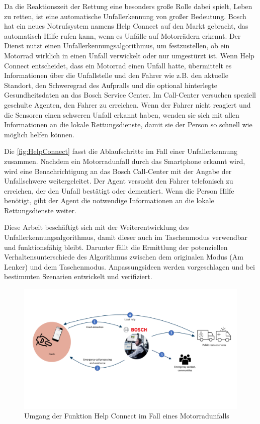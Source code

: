 Da die Reaktionszeit der Rettung eine besonders große Rolle dabei spielt, Leben zu retten, ist eine automatische Unfallerkennung von großer Bedeutung.
Bosch hat ein neues Notrufsystem namens \glqq Help Connect\grqq{} auf den Markt gebracht, das automatisch Hilfe rufen kann, wenn es Unfälle auf Motorrädern erkennt.
Der Dienst nutzt einen Unfallerkennungsalgorithmus, um festzustellen, ob ein Motorrad wirklich in einen Unfall verwickelt oder nur umgestürzt ist.
Wenn \glqq Help Connect\grqq{} entscheidet, dass ein Motorrad einen Unfall hatte, übermittelt es Informationen über die Unfallstelle und den Fahrer wie z.B. den aktuelle Standort, den Schweregrad des Aufpralls und die optional hinterlegte Gesundheitsdaten an das Bosch Service Center.
Im Call-Center versuchen speziell geschulte Agenten, den Fahrer zu erreichen. Wenn der Fahrer nicht reagiert und die Sensoren einen schweren Unfall erkannt haben, wenden sie sich mit allen Informationen an die lokale Rettungsdienste, damit sie der Person so schnell wie möglich helfen können.

Die \autoref{fig:HelpConnect} fasst die Ablaufschritte im Fall einer Unfallerkennung zusammen. Nachdem ein Motorradunfall durch das Smartphone erkannt wird, wird eine Benachrichtigung an das Bosch Call-Center mit der Angabe der Unfallschwere weitergeleitet. Der Agent versucht den Fahrer telefonisch zu erreichen, der den Unfall bestätigt oder dementiert. Wenn die Person Hilfe benötigt, gibt der Agent die notwendige Informationen an die lokale Rettungsdienste weiter.

Diese Arbeit beschäftigt sich mit der Weiterentwicklung des Unfallerkennungsalgorithmus, damit dieser auch im Taschenmodus verwendbar und funktionsfähig bleibt. Darunter fällt die Ermittlung der potenziellen Verhaltensunterschiede des Algorithmus zwischen dem originalen Modus (Am Lenker) und dem Taschenmodus. Anpassungsideen werden vorgeschlagen und bei bestimmten Szenarien entwickelt und verifiziert.

\begin{figure}[htpb]
	\centering
	\includegraphics[width=\linewidth]{Bilder/HelpConnect.pdf}
	\caption{Umgang der Funktion \glqq Help Connect\grqq{} im Fall eines Motorradunfalls}
	\label{fig:HelpConnect}
\end{figure}


